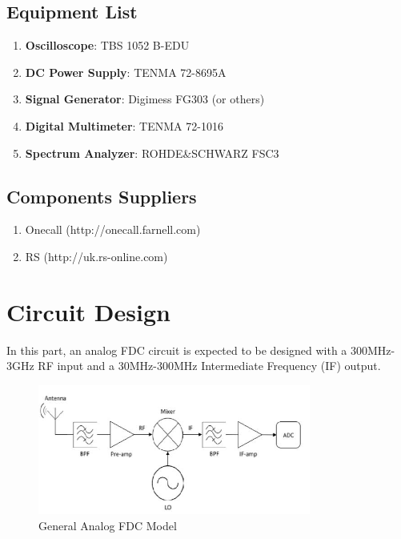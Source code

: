 \documentclass[12pt, a4paper]{report}
\begin{document}
\subsection{Equipment List}

\begin{enumerate}

\item \textbf{Oscilloscope}: TBS 1052 B-EDU
\item \textbf{DC Power Supply}: TENMA 72-8695A
\item \textbf{Signal Generator}: Digimess FG303 (or others)
\item \textbf{Digital Multimeter}: TENMA 72-1016
\item \textbf{Spectrum Analyzer}: ROHDE&SCHWARZ FSC3

\end{enumerate}


\subsection{Components Suppliers}
\begin{enumerate} \addtolength{\itemsep}{-0.5\baselineskip}
    \item Onecall (http://onecall.farnell.com)
    \item RS (http://uk.rs-online.com)
\end{enumerate}

\section{Circuit Design}

In this part, an analog FDC circuit is expected to be designed with a 300MHz-3GHz RF input and a 30MHz-300MHz Intermediate Frequency (IF) output. 


\begin{figure}[htbp]     \begin{centering}
    \includegraphics[width=0.8\textwidth]{img/model.jpg}
    \caption{\label{Fig:model}General Analog FDC Model}
    \end{centering}
\end{figure}
\end{document}
